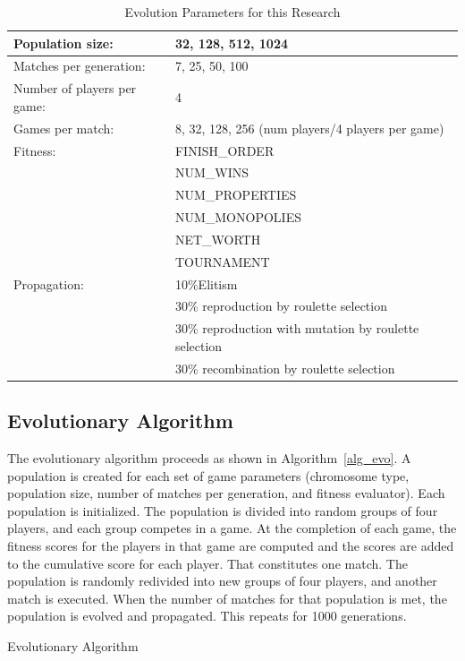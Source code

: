 \begin{table}[ht]
\caption{Evolution Parameters for this Research}
\begin{center}
\begin{tabular}{ | l | l | }
  \hline                        
  Population size: & 32, 128, 512, 1024 \\ \hline
  Matches per generation: & 7, 25, 50, 100 \\ \hline
  Number of players per game: & 4 \\ \hline
  Games per match: & 8, 32, 128, 256 (num players/4 players per game) \\ \hline
  Fitness: & FINISH\_ORDER \\ 
           & NUM\_WINS \\
           & NUM\_PROPERTIES \\ 
           & NUM\_MONOPOLIES \\
           & NET\_WORTH \\ 
           & TOURNAMENT \\ \hline
  Propagation: & 10\%Elitism \\
               & 30\% reproduction by roulette selection \\
               & 30\% reproduction with mutation by roulette selection \\ 
               & 30\% recombination by roulette selection \\ \hline  
\end{tabular}
\label{table-evoparams}
\end{center}
\end{table}

\subsection{Evolutionary Algorithm}

The evolutionary algorithm proceeds as shown in Algorithm~\ref{alg_evo}. A
population is created for each set of game parameters (chromosome type,
population size, number of matches per generation, and fitness evaluator).
Each population is initialized. The population is divided into random groups of
four players, and each group competes in a game. At the completion of each game,
the fitness scores for the players in that game are computed and the scores are
added to the cumulative score for each player. That constitutes one match. The
population is randomly redivided into new groups of four players, and another
match is executed. When the number of matches for that population is met, the
population is evolved and propagated. This repeats for 1000 generations.

\begin{algorithm}
\caption{Evolutionary Algorithm}
\label{alg_evo}
\begin{algorithmic}
\REPEAT
\REPEAT
{}
\ENDFOR
\ENDFOR
\ENDFOR
\ENDFOR
\end{algorithmic}
\end{algorithm}